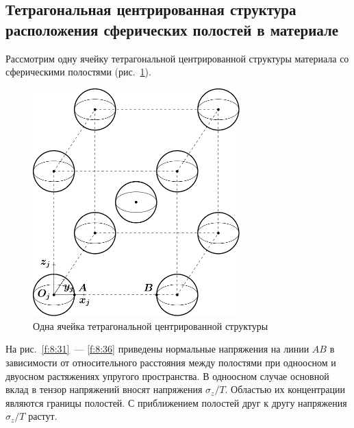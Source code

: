 
\subsection{Тетрагональная центрированная структура расположения сферических полостей в материале}

Рассмотрим одну ячейку тетрагональной центрированной структуры материала со сферическими полостями (рис.~\ref{f:8:30}).

\begin{figure}[h!]
\centering
\includegraphics[width=8cm]{spheres-cav-9.pdf}
\caption{Одна ячейка тетрагональной центрированной структуры}
\label{f:8:30}
\end{figure}

На рис.~\ref{f:8:31}~--- \ref{f:8:36} приведены нормальные напряжения на линии $AB$ в зависимости от относительного расстояния между полостями при одноосном и двуосном растяжениях упругого пространства. В одноосном случае основной вклад в тензор напряжений вносят напряжения $\sigma_z/T$. Областью их концентрации являются границы полостей. С приближением полостей друг к другу напряжения $\sigma_z/T$ растут.

